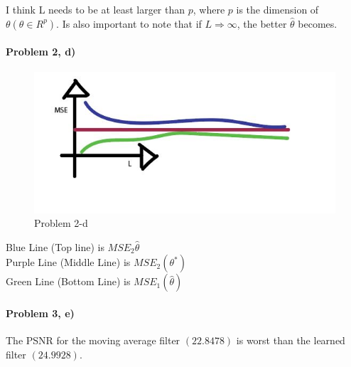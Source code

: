 \documentclass[11pt]{article}
\begin{document}
\begin{flushleft}
    I think L needs to be at least larger than $p$, where $p$ is the dimension of $\theta (\theta \in R^p)$. Is also important to note that if $L \Rightarrow \infty$, the better $\hat{\theta}$ becomes.
\end{flushleft} 
 
\newpage
\paragraph{\noindent\textbf{\LARGE{Problem 2, d)}}}  

\begin{flushleft}
    \begin{figure}[htbp]
        \centerline{\includegraphics[scale=.5]{graph.JPG}}
        \caption{Problem 2-d}
        \label{fig}
    \end{figure}

    Blue Line (Top line) is $MSE_2\hat{\theta}$ \\
    Purple Line (Middle Line) is $MSE_2(\theta^*)$ \\
    Green Line (Bottom Line) is $MSE_1(\hat{\theta})$
\end{flushleft}

\paragraph{\noindent\textbf{\LARGE{Problem 3, e)}}}  
  
\begin{flushleft}
    The PSNR for the moving average filter $(22.8478)$ is worst than the learned filter $(24.9928)$.
\end{flushleft} 
 
\end{document}
